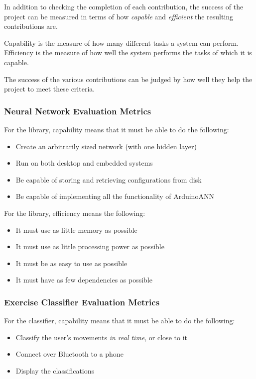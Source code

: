 \documentclass[a4paper]{article}
\begin{document}
In addition to checking the completion of each contribution, the success of the project can be measured in terms of how \textit{capable} and \textit{efficient} the resulting contributions are. 

Capability is the measure of how many different tasks a system can perform.
Efficiency is the measure of how well the system performs the tasks of which it is capable. 

The success of the various contributions can be judged by how well they help the project to meet these criteria.

\subsubsection{Neural Network Evaluation Metrics}

For the library, capability means that it must be able to do the following:

\begin{itemize}
\item Create an arbitrarily sized network (with one hidden layer)
\item Run on both desktop and embedded systems
\item Be capable of storing and retrieving configurations from disk
\item Be capable of implementing all the functionality of ArduinoANN
\end{itemize}

For the library, efficiency means the following:

\begin{itemize}
\item It must use as little memory as possible
\item It must use as little processing power as possible
\item It must be as easy to use as possible
\item It must have as few dependencies as possible
\end{itemize}

\subsubsection{Exercise Classifier Evaluation Metrics}

For the classifier, capability means that it must be able to do the following:

\begin{itemize}
\item Classify the user's movements \textit{in real time}, or close to it
\item Connect over Bluetooth to a phone
\item Display the classifications
\end{itemize}
\end{document}
